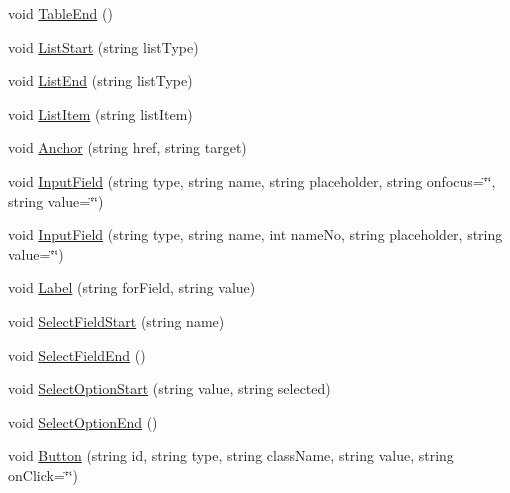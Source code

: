\begin{DoxyCompactItemize}
\item 
void \hyperlink{classPageStructureMaker_a7f8fefbe7a825c1b7761fc8a0f1bb8e4}{\-Table\-End} ()
\item 
void \hyperlink{classPageStructureMaker_ac24ce26202757aaa30402155daf8a3d0}{\-List\-Start} (string list\-Type)
\item 
void \hyperlink{classPageStructureMaker_a8578b1555ad2fc92a9efc7dbf7d1fe87}{\-List\-End} (string list\-Type)
\item 
void \hyperlink{classPageStructureMaker_adf4116e526026edc3c8a3bcf96a7e929}{\-List\-Item} (string list\-Item)
\item 
void \hyperlink{classPageStructureMaker_a8c0fae5b599182863066de56ae0cea42}{\-Anchor} (string href, string target)
\item 
void \hyperlink{classPageStructureMaker_a5e5876babd4602e5c799d3f551c7b779}{\-Input\-Field} (string type, string name, string placeholder, string onfocus=\char`\"{}\char`\"{}, string value=\char`\"{}\char`\"{})
\item 
void \hyperlink{classPageStructureMaker_af528f8da142cbc47585c4dfeded873ba}{\-Input\-Field} (string type, string name, int name\-No, string placeholder, string value=\char`\"{}\char`\"{})
\item 
void \hyperlink{classPageStructureMaker_ae85f66489db9a65682bb9a2c2128f433}{\-Label} (string for\-Field, string value)
\item 
void \hyperlink{classPageStructureMaker_ae8684bb66ca463e2f92e09c96137f9e3}{\-Select\-Field\-Start} (string name)
\item 
void \hyperlink{classPageStructureMaker_a81eb3cdbc840a4c8165cef87330ade09}{\-Select\-Field\-End} ()
\item 
void \hyperlink{classPageStructureMaker_a77856078e74dab25329132ea07466f92}{\-Select\-Option\-Start} (string value, string selected)
\item 
void \hyperlink{classPageStructureMaker_a7682f479f7f1012d426ec9f9535def60}{\-Select\-Option\-End} ()
\item 
void \hyperlink{classPageStructureMaker_a53c013b1d6251be853be8f6c413e3455}{\-Button} (string id, string type, string class\-Name, string value, string on\-Click=\char`\"{}\char`\"{})
\end{DoxyCompactItemize}
